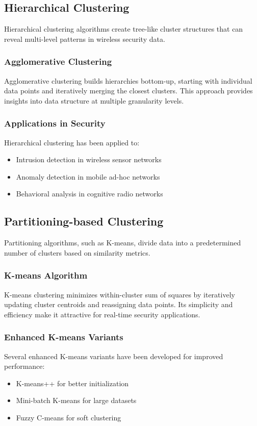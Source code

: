 \subsection{Hierarchical Clustering}
Hierarchical clustering algorithms create tree-like cluster structures that can reveal multi-level patterns in wireless security data.

\subsubsection{Agglomerative Clustering}
Agglomerative clustering builds hierarchies bottom-up, starting with individual data points and iteratively merging the closest clusters. This approach provides insights into data structure at multiple granularity levels.

\subsubsection{Applications in Security}
Hierarchical clustering has been applied to:
\begin{itemize}
\item Intrusion detection in wireless sensor networks
\item Anomaly detection in mobile ad-hoc networks
\item Behavioral analysis in cognitive radio networks
\end{itemize}

\subsection{Partitioning-based Clustering}
Partitioning algorithms, such as K-means, divide data into a predetermined number of clusters based on similarity metrics.

\subsubsection{K-means Algorithm}
K-means clustering minimizes within-cluster sum of squares by iteratively updating cluster centroids and reassigning data points. Its simplicity and efficiency make it attractive for real-time security applications.

\subsubsection{Enhanced K-means Variants}
Several enhanced K-means variants have been developed for improved performance:
\begin{itemize}
\item K-means++ for better initialization
\item Mini-batch K-means for large datasets
\item Fuzzy C-means for soft clustering
\end{itemize}

